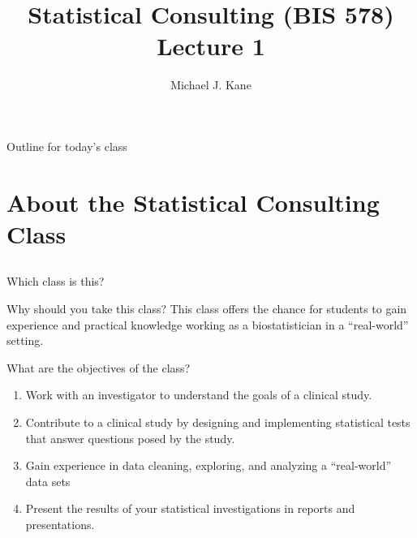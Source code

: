 \documentclass[14pt]{beamer}
\title{Statistical Consulting (BIS 578) Lecture 1}
\author{Michael J. Kane}
\date{}
\begin{document}
\begin{frame}
  \titlepage
\end{frame}

\begin{frame}{Outline for today's class}
  \tableofcontents
  \let\thefootnote\relax{}
\end{frame}

\section{About the Statistical Consulting Class}

\subsection*{}

\begin{frame}{Which class is this?}
\begin{center}
\end{center}
\end{frame}

\begin{frame}{Why should you take this class?}
This class offers the chance for students to gain experience and practical 
knowledge working as a biostatistician in a ``real-world'' setting. 
\end{frame}

\begin{frame}{What are the objectives of the class?}
\begin{enumerate}
\item Work with an investigator to understand the goals of a clinical study.
\item Contribute to a clinical study by designing and implementing statistical 
  tests that answer questions posed by the study.
\item Gain experience in data cleaning, exploring, and analyzing a 
  ``real-world'' data sets
\item Present the results of your statistical investigations in reports 
  and presentations.
\end{enumerate}
\end{frame}
\end{document}
